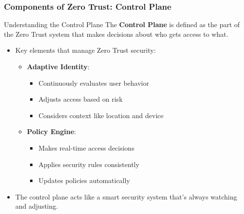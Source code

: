 \documentclass{beamer}
\begin{document}
\begin{frame}
    \frametitle{Components of Zero Trust: Control Plane}

    \begin{block}{Understanding the Control Plane}
        The \textbf{Control Plane} is defined as the part of the Zero Trust system that makes decisions about who gets access to what.
    \end{block}

    \begin{itemize}
        \item Key elements that manage Zero Trust security:
            \begin{itemize}
                \item \textbf{Adaptive Identity}:
                    \begin{itemize}
                        \item Continuously evaluates user behavior
                        \item Adjusts access based on risk
                        \item Considers context like location and device
                    \end{itemize}
                \item \textbf{Policy Engine}:
                    \begin{itemize}
                        \item Makes real-time access decisions
                        \item Applies security rules consistently
                        \item Updates policies automatically
                    \end{itemize}
            \end{itemize}
        \item The control plane acts like a smart security system that's always watching and adjusting.
    \end{itemize}
\end{frame}
\end{document}
